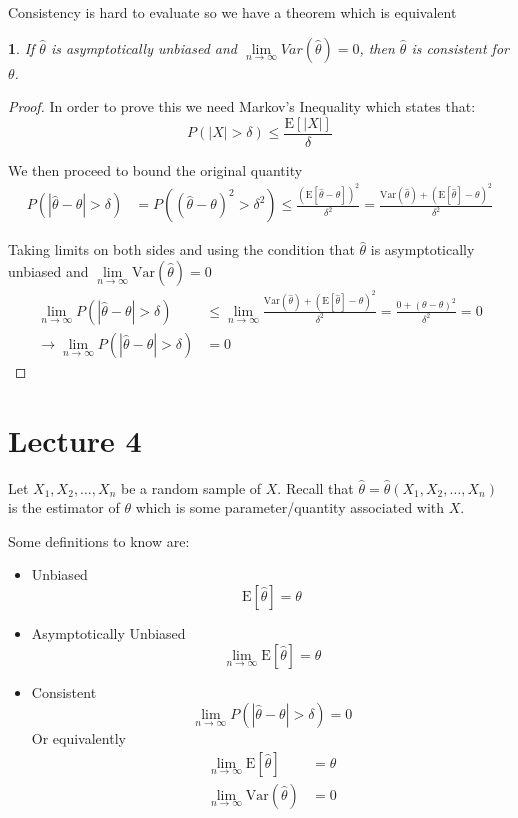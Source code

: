 \documentclass[english,12pt]{article}
\theoremstyle{plain}
\newtheorem*{theorem}{\protect\theoremname}
\theoremstyle{definition}
\theoremstyle{definition} %
\providecommand{\theoremname}{Theorem}
\newcommand{\ex}[1]{\mbox{E} \left[ #1 \right]}
\newcommand{\var}[1]{\mbox{Var} \left( #1 \right)}
\begin{document}
Consistency is hard to evaluate so we have a theorem which is equivalent

\begin{theorem}
If $\hat\theta$ is asymptotically unbiased and $\lim\limits_{n\to\infty}Var(\hat\theta)=0$, then $\hat\theta$ is consistent for $\theta$.
\end{theorem}

\begin{proof}
In order to prove this we need Markov's Inequality which states that:
\[P(|X|>\delta)\le \frac{\ex{|X|}}{\delta}\]

We then proceed to bound the original quantity
\begin{align*}
P(|\hat\theta-\theta|>\delta)&=P((\hat\theta-\theta)^2>\delta^2)
\le \frac{\left(\ex{\hat\theta-\theta}\right)^2}{\delta^2}
=\frac{\var{\hat\theta}+\left(\ex{\hat\theta}-\theta\right)^2}{\delta^2}
\end{align*}

Taking limits on both sides and using the condition that $\hat\theta$ is asymptotically unbiased and $\lim\limits_{n\to\infty}\var{\hat\theta}=0$
\begin{align*}
\lim_{n\to\infty}P(|\hat\theta-\theta|>\delta)&\le\lim\limits_{n\to\infty} \frac{\var{\hat\theta}+\left(\ex{\hat\theta}-\theta\right)^2}{\delta^2}
=\frac{0+\left(\theta-\theta\right)^2}{\delta^2}
=0\\
\rightarrow \lim_{n\to\infty}P(|\hat\theta-\theta|>\delta)&=0
\end{align*}
\end{proof}

\section*{Lecture 4}
Let $X_1,X_2,\ldots,X_n$ be a random sample of $X$.  Recall that $\hat\theta=\hat\theta(X_1,X_2,\ldots,X_n)$ is the estimator of $\theta$ which is some parameter/quantity associated with $X$.

Some definitions to know are:
\begin{itemize}
\item Unbiased
\[\ex{\hat\theta}=\theta\]
\item Asymptotically Unbiased
\[\lim\limits_{n\to\infty}\ex{\hat\theta}=\theta\]
\item Consistent
\[\lim\limits_{n\to\infty}P(|\hat\theta-\theta|>\delta)=0\]
Or equivalently
\begin{align*}
\lim\limits_{n\to\infty}\ex{\hat\theta}&=\theta\\
\lim\limits_{n\to\infty}\var{\hat\theta}&=0
\end{align*}
\end{itemize}
\end{document}
